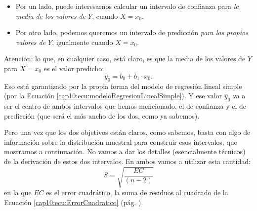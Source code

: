 \begin{itemize}
  \item Por un lado, puede interesarnos calcular un intervalo de confianza para {\em la media de los valores de $Y$}, cuando $X=x_0$.
  \item Por otro lado, podemos queremos un intervalo de predicción {\em para los propios valores de $Y$}, igualmente cuando $X=x_0$.
\end{itemize}
Atención: lo que, en cualquier caso, está claro, es que la media de los valores de $Y$ para $X=x_0$ es el valor predicho:
\[\hat y_0=b_0+b_1\cdot x_0.\]
Eso está garantizado por la propia forma del modelo de regresión lineal simple (por la Ecuación \ref{cap10:ecu:modeloRegresionLinealSimple}). Y ese valor $\hat y_0$ va a ser el centro de ambos intervalos que hemos mencionado, el de confianza y el de predicción (que será el más ancho de los dos, como ya sabemos).

Pero una vez que los dos objetivos están claros, como sabemos, basta con algo de información sobre la distribución muestral para construir esos intervalos, que mostramos a continuación. No vamos a dar los detalles (esencialmente técnicos) de la derivación de estos dos intervalos. En ambos vamos a utilizar esta cantidad:
\begin{equation}\label{cap10:ecu:FragmentoIntervalosConfianzaPredciccion}
    S=\sqrt{\dfrac{EC}{(n-2)}}
\end{equation}
en la que $EC$ es el error cuadrático, la suma de residuos al cuadrado de la Ecuación \ref{cap10:ecu:ErrorCuadratico} (pág. \pageref{cap10:ecu:ErrorCuadratico}).

    \begin{center}
    \end{center}

